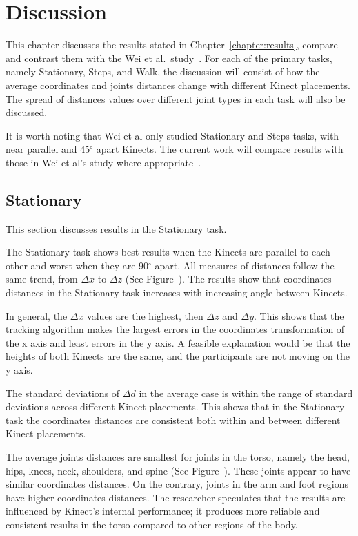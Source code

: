 


\chapter{Discussion}

\label{chapter:discussion}

This chapter discusses the results stated in Chapter~\ref{chapter:results}, compare and contrast them with the Wei et al.\ study~\cite{wei_kinect_calibration}. For each of the primary tasks, namely Stationary, Steps, and Walk, the discussion will consist of how the average coordinates and joints distances change with different Kinect placements. The spread of distances values over different joint types in each task will also be discussed.

It is worth noting that Wei et al only studied Stationary and Steps tasks, with near parallel and 45$^{\circ}$ apart Kinects. The current work will compare results with those in Wei et al's study where appropriate~\cite{wei_kinect_calibration}.

\section{Stationary}
\label{sec:discussion_stationary}

This section discusses results in the Stationary task.

The Stationary task shows best results when the Kinects are parallel to each other and worst when they are 90$^{\circ}$ apart. All measures of distances follow the same trend, from $\Delta x$ to $\Delta z$ (See Figure~). The results show that coordinates distances in the Stationary task increases with increasing angle between Kinects.

In general, the $\Delta x$ values are the highest, then $\Delta z$ and $\Delta y$. This shows that the tracking algorithm makes the largest errors in the coordinates transformation of the x axis and least errors in the y axis. A feasible explanation would be that the heights of both Kinects are the same, and the participants are not moving on the y axis.

The standard deviations of $\Delta d$ in the average case is within the range of standard deviations across different Kinect placements. This shows that in the Stationary task the coordinates distances are consistent both within and between different Kinect placements.

The average joints distances are smallest for joints in the torso, namely the head, hips, knees, neck, shoulders, and spine (See Figure~). These joints appear to have similar coordinates distances. On the contrary, joints in the arm and foot regions have higher coordinates distances. The researcher speculates that the results are influenced by Kinect's internal performance; it produces more reliable and consistent results in the torso compared to other regions of the body.

